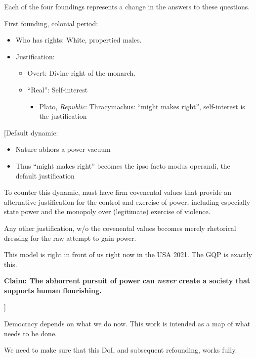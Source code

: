 \documentclass[
]{book}
\providecommand{\tightlist}{%
  \setlength{\itemsep}{0pt}\setlength{\parskip}{0pt}}
\begin{document}
Each of the four foundings represents a change in the answers to these questions.

First founding, colonial period:

\begin{itemize}
\tightlist
\item
  Who has rights: White, propertied males.
\item
  Justification:

  \begin{itemize}
  \tightlist
  \item
    Overt: Divine right of the monarch.
  \item
    ``Real'': Self-interest

    \begin{itemize}
    \tightlist
    \item
      Plato, \emph{Republic}: Thracymachus: ``might makes right'', self-interest is the justification
    \end{itemize}
  \end{itemize}
\end{itemize}

{[}Default dynamic:

\begin{itemize}
\tightlist
\item
  Nature abhors a power vacuum
\item
  Thus ``might makes right'' becomes the ipso facto modus operandi, the default justification
\end{itemize}

To counter this dynamic, must have firm covenental values that provide an alternative justification for the control and exercise of power, including especially state power and the monopoly over (legitimate) exercise of violence.

Any other justification, w/o the covenental values becomes merely rhetorical dressing for the raw attempt to gain power.

This model is right in front of us right now in the USA 2021. The GQP is exactly this.

\textbf{Claim: The abhorrent pursuit of power can \emph{never} create a society that supports human flourishing.}

{]}

Democracy depends on what we do now. This work is intended as a map of what needs to be done.

We need to make sure that this DoI, and subsequent refounding, works fully.
\end{document}
